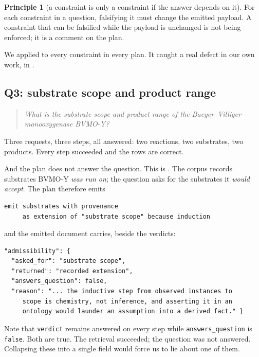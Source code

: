 \documentclass[11pt,a4paper]{article}
\theoremstyle{plain}
\theoremstyle{definition}
\newtheorem{principle}[theorem]{Principle}
\theoremstyle{remark}
\newcommand{\vans}{\textsf{answered}}
\begin{document}
\begin{principle}[a constraint is only a constraint if the answer
depends on it]
\label{prin:counterfactual}
For each constraint in a question, falsifying it must change the
emitted payload. A constraint that can be falsified while the payload
is unchanged is not being enforced; it is a comment on the plan.
\end{principle}

We applied  to every constraint in every
plan. It caught a real defect in our own work, in .

\subsection{Q3: substrate scope and product range}
\label{sec:q3}

\begin{quote}
\emph{What is the substrate scope and product range of the
Baeyer--Villiger monooxygenase BVMO-Y?}
\end{quote}

Three requests, three steps, all \vans: two reactions, two substrates,
two products. Every step succeeded and the rows are correct.

And the plan does not answer the question. This is . The
corpus records substrates BVMO-Y \emph{was run on}; the question asks
for the substrates it \emph{would accept}. The plan therefore emits

\begin{lstlisting}[style=hfq]
emit substrates with provenance
     as extension of "substrate scope" because induction
\end{lstlisting}

and the emitted document carries, beside the verdicts:

\begin{lstlisting}[style=hfq]
"admissibility": {
  "asked_for": "substrate scope",
  "returned": "recorded extension",
  "answers_question": false,
  "reason": "... the inductive step from observed instances to
     scope is chemistry, not inference, and asserting it in an
     ontology would launder an assumption into a derived fact." }
\end{lstlisting}

Note that \texttt{verdict} remains \vans{} on every step while
\texttt{answers\_question} is \texttt{false}. Both are true. The
retrieval succeeded; the question was not answered. Collapsing these
into a single field would force us to lie about one of them.
\end{document}
